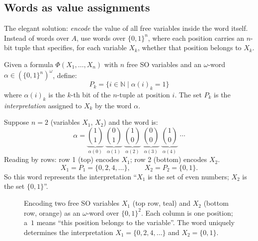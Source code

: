 \subsection{Words as value assignments}

The elegant solution: \emph{encode} the value of all free variables
inside the word itself.  Instead of words over $A$, use words over
$\{0,1\}^n$, where each position carries an $n$-bit tuple that specifies,
for each variable $X_k$, whether that position belongs to $X_k$.

\begin{definition}
Given a formula $\Phi(X_1, \ldots, X_n)$ with $n$ free SO variables and
an $\omega$-word $\alpha \in (\{0,1\}^n)^\omega$, define:
\[
  P_k = \{i \in \mathbb{N} \mid \alpha(i)_k = 1\}
\]
where $\alpha(i)_k$ is the $k$-th bit of the $n$-tuple at position $i$.
The set $P_k$ is the \emph{interpretation} assigned to $X_k$ by the
word $\alpha$.
\end{definition}

\begin{example}
Suppose $n = 2$ (variables $X_1$, $X_2$) and the word is:
\[
  \alpha = \underbrace{\binom{1}{1}}_{\alpha(0)}\;
           \underbrace{\binom{0}{1}}_{\alpha(1)}\;
           \underbrace{\binom{1}{0}}_{\alpha(2)}\;
           \underbrace{\binom{0}{0}}_{\alpha(3)}\;
           \underbrace{\binom{1}{0}}_{\alpha(4)}\;\cdots
\]
Reading by rows: row 1 (top) encodes $X_1$; row 2 (bottom) encodes $X_2$.
\[
  X_1 = P_1 = \{0, 2, 4, \ldots\}, \qquad
  X_2 = P_2 = \{0, 1\}.
\]
So this word represents the interpretation ``$X_1$ is the set of even
numbers; $X_2$ is the set $\{0,1\}$''.
\end{example}

\begin{figure}[ht]
  \centering
  \caption{Encoding two free SO variables $X_1$ (top row, teal) and $X_2$
           (bottom row, orange) as an $\omega$-word over $\{0,1\}^2$.
           Each column is one position; a~$1$ means ``this position belongs
           to the variable''.  The word uniquely determines the interpretation
           $X_1 = \{0,2,4,\ldots\}$ and $X_2 = \{0,1\}$.}
  \label{fig:s1s-encoding}
\end{figure}

